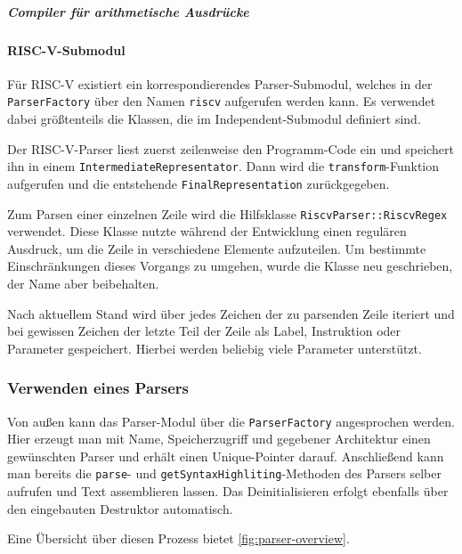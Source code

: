 \subparagraph{Compiler für arithmetische Ausdrücke}

\paragraph{RISC-V-Submodul}

Für RISC-V existiert ein korrespondierendes Parser-Submodul, welches in der
\texttt{ParserFactory} über den Namen \texttt{riscv} aufgerufen werden kann. Es
verwendet dabei größtenteils die Klassen, die im Independent-Submodul definiert
sind.

Der RISC-V-Parser liest zuerst zeilenweise den Programm-Code ein und speichert
ihn in einem \texttt{Intermediate\-Representator}. Dann wird die
\texttt{transform}-Funktion aufgerufen und die entstehende
\texttt{Final\-Representation} zurückgegeben.

Zum Parsen einer einzelnen Zeile wird die Hilfsklasse
\texttt{RiscvParser::\allowbreak{}RiscvRegex} verwendet. Diese Klasse nutzte
während der Entwicklung einen regulären Ausdruck, um die Zeile in
verschiedene Elemente aufzuteilen. Um bestimmte Einschränkungen dieses Vorgangs
zu umgehen, wurde die Klasse neu geschrieben, der Name aber beibehalten.

Nach aktuellem Stand wird über jedes Zeichen der zu parsenden Zeile iteriert und
bei gewissen Zeichen der letzte Teil der Zeile als Label, Instruktion oder
Parameter gespeichert. Hierbei werden beliebig viele Parameter unterstützt.

\subsubsection{Verwenden eines Parsers}

Von außen kann das Parser-Modul über die \texttt{ParserFactory} angesprochen
werden. Hier erzeugt man mit Name, Speicherzugriff und gegebener Architektur
einen gewünschten Parser und erhält einen Unique-Pointer darauf. Anschließend
kann man bereits die \texttt{parse}- und \texttt{getSyntaxHighliting}-Methoden
des Parsers selber aufrufen und Text assemblieren lassen. Das Deinitialisieren
erfolgt ebenfalls über den eingebauten Destruktor automatisch.

Eine Übersicht über diesen Prozess bietet \autoref{fig:parser-overview}.

